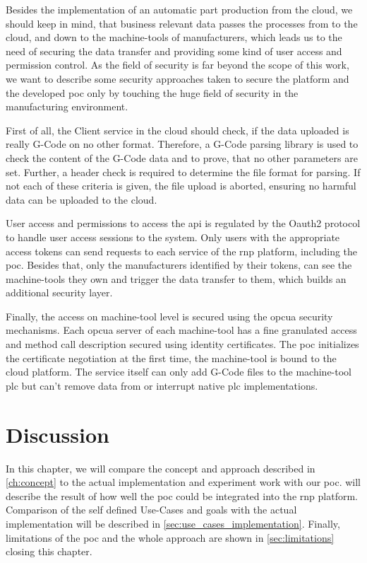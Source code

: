 \documentclass[
a4paper,
twoside,
headsepline,
cleardoublepage=empty,
parskip=half,
draft=false
]{scrbook}
\begin{document}
				Besides the implementation of an automatic part production from the cloud, we should keep in mind, that business relevant data passes the processes from to the cloud, and down to the machine-tools of manufacturers, which leads us to the need of securing the data transfer and providing some kind of user access and permission control. As the field of security is far beyond the scope of this work, we want to describe some security approaches taken to secure the platform and the developed \gls{poc} only by touching the huge field of security in the manufacturing environment.

				First of all, the Client service in the cloud should check, if the data uploaded is really G-Code on no other format. Therefore, a G-Code parsing library is used to check the content of the G-Code data and to prove, that no other parameters are set. Further, a header check is required to determine the file format for parsing. If not each of these criteria is given, the file upload is aborted, ensuring no harmful data can be uploaded to the cloud.

				User access and permissions to access the \gls{api} is regulated by the Oauth2 protocol to handle user access sessions to the system. Only users with the appropriate access tokens can send requests to each service of the \gls{rnp} platform, including the \gls{poc}. Besides that, only the manufacturers identified by their tokens, can see the machine-tools they own and trigger the data transfer to them, which builds an additional security layer.

				Finally, the access on machine-tool level is secured using the \gls{opcua} security mechanisms. Each \gls{opcua} server of each machine-tool has a fine granulated access and method call description secured using identity certificates. The \gls{poc} initializes the certificate negotiation at the first time, the machine-tool is bound to the cloud platform. The service itself can only add G-Code files to the machine-tool \gls{plc} but can't remove data from or interrupt native \gls{plc} implementations.

	\chapter{Discussion} \label{ch:discusion}

		In this chapter, we will compare the concept and approach described in \cref{ch:concept} to the actual implementation and experiment work with our \gls{poc}.  will describe the result of how well the \gls{poc} could be integrated into the \gls{rnp} platform. Comparison of the self defined Use-Cases and goals with the actual implementation will be described in \cref{sec:use_cases_implementation}. Finally, limitations of the \gls{poc} and the whole approach are shown in \cref{sec:limitations} closing this chapter.
\end{document}

